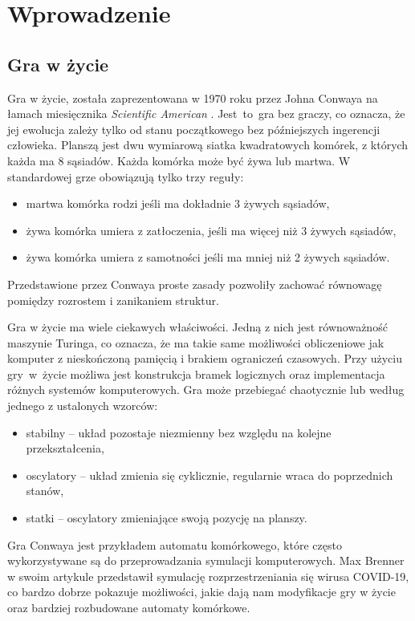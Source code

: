\documentclass[declaration,shortabstract, inz]{iithesis}
\author         {Marcin Rogala}
\date          {\today}
\theoremstyle{definition} \newtheorem{definition}{Definicja}[]
\theoremstyle{plain} \newtheorem{remark}[definition]{Obserwacja}
\theoremstyle{plain} \newtheorem{theorem}[definition]{Twierdzenie}
\theoremstyle{plain} \newtheorem{example}{Przykład}[definition]
\theoremstyle{plain} \newtheorem{lemma}[definition]{Lemat}
\begin{document}
\chapter{Wprowadzenie}
\section{Gra w życie}
Gra w życie, została zaprezentowana w 1970 roku przez Johna Conwaya na łamach miesięcznika \textit{Scientific American} \cite{gardner}.  Jest~to~gra bez graczy, co oznacza, że jej ewolucja zależy tylko od stanu początkowego bez późniejszych ingerencji człowieka. Planszą jest dwu wymiarową siatka kwadratowych komórek, z których każda ma 8 sąsiadów. Każda komórka może być żywa lub martwa. W standardowej grze obowiązują tylko trzy reguły:

\begin{itemize}
\item martwa komórka rodzi jeśli ma dokładnie 3 żywych sąsiadów,
\item żywa komórka umiera z zatłoczenia, jeśli ma więcej niż 3 żywych sąsiadów,
\item żywa komórka umiera z samotności jeśli ma mniej niż 2 żywych sąsiadów.
\end{itemize}

Przedstawione przez Conwaya proste zasady pozwoliły zachować równowagę pomiędzy rozrostem i zanikaniem struktur.

Gra w życie ma wiele ciekawych właściwości. Jedną z nich jest równoważność maszynie Turinga, co oznacza, że ma takie same możliwości obliczeniowe jak komputer z nieskończoną pamięcią i brakiem ograniczeń czasowych. Przy użyciu gry~w~życie możliwa jest konstrukcja bramek logicznych oraz implementacja różnych systemów komputerowych. Gra może przebiegać chaotycznie lub według jednego z ustalonych wzorców: 
\begin{itemize}
	\item stabilny -- układ pozostaje niezmienny bez względu na kolejne przekształcenia,
	\item oscylatory -- układ zmienia się cyklicznie, regularnie wraca do poprzednich stanów,
	\item statki -- oscylatory zmieniające swoją pozycję na planszy.
\end{itemize}

Gra Conwaya jest przykładem automatu komórkowego, które często wykorzystywane są do przeprowadzania symulacji komputerowych. 
Max Brenner w swoim artykule \cite{brenner} przedstawił symulację rozprzestrzeniania się wirusa COVID-19, co bardzo dobrze pokazuje możliwości, jakie dają nam modyfikacje gry w życie oraz bardziej rozbudowane automaty komórkowe.
\end{document}
